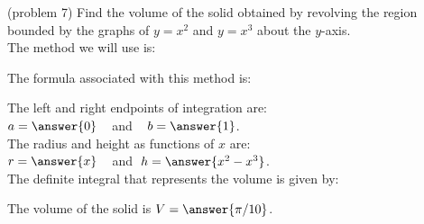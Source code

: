 \documentclass{ximera}
\begin{document}
\begin{problem}(problem 7)
Find the volume of the solid obtained by revolving the region bounded by the graphs of $y = x^2$ and $y = x^3$ about the $y$-axis.\\
The method we will use is:
\begin{multipleChoice}
\end{multipleChoice}

The formula associated with this method is:
\begin{multipleChoice}
\end{multipleChoice}

The left and right endpoints of integration are:\\
$a = \answer{0}\;\;\;$ and $\;\;\; b = \answer{1}$.\\
The radius and height as functions of $x$ are:\\
$r = \answer{x} \;\;\;$ and $\; h = \answer{x^2 -x^3}$.\\

The definite integral that represents the volume is given by:\\
\begin{multipleChoice}
\end{multipleChoice}

The volume of the solid is $V = \answer{\pi/10}$.

\end{problem}
\end{document}
